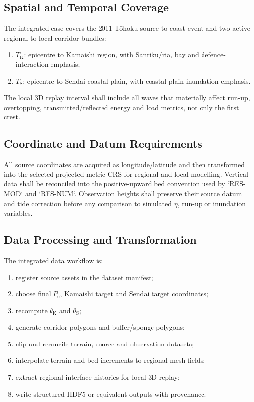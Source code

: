 \subsection{Spatial and Temporal Coverage}
\label{sec:res-dat-cas-spatial-temporal-coverage}

The integrated case covers the 2011 Tōhoku source-to-coast event and
two active regional-to-local corridor bundles:

\begin{enumerate}
  \item $T_{\mathrm{K}}$: epicentre to Kamaishi region, with
    Sanriku/ria, bay and defence-interaction emphasis;
  \item $T_{\mathrm{S}}$: epicentre to Sendai coastal plain, with
    coastal-plain inundation emphasis.
\end{enumerate}

The local 3D replay interval shall include all waves that materially
affect run-up, overtopping, transmitted/reflected energy and load
metrics, not only the first crest.

\subsection{Coordinate and Datum Requirements}
\label{sec:res-dat-cas-coordinate-datum-requirements}

All source coordinates are acquired as longitude/latitude and then
transformed into the selected projected metric CRS for regional and
local modelling. Vertical data shall be reconciled into the
positive-upward bed convention used by `RES-MOD` and `RES-NUM`.
Observation heights shall preserve their source datum and tide
correction before any comparison to simulated $\eta$, run-up or
inundation variables.

\subsection{Data Processing and Transformation}
\label{sec:res-dat-cas-data-processing-transformation}

The integrated data workflow is:

\begin{enumerate}
  \item register source assets in the dataset manifest;
  \item choose final $P_{\mathrm{e}}$, Kamaishi target and Sendai
    target coordinates;
  \item recompute $\theta_{\mathrm{K}}$ and $\theta_{\mathrm{S}}$;
  \item generate corridor polygons and buffer/sponge polygons;
  \item clip and reconcile terrain, source and observation datasets;
  \item interpolate terrain and bed increments to regional mesh
    fields;
  \item extract regional interface histories for local 3D replay;
  \item write structured HDF5 or equivalent outputs with provenance.
\end{enumerate}

